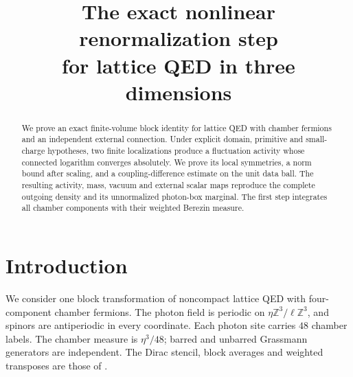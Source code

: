   \RequirePackage[backend=biber,style=alphabetic,backref=true,
    giveninits=true,isbn=false,date=year]{biblatex}
  
  \setcounter{biburlnumpenalty}{100}
  \setcounter{biburllcpenalty}{100}
  \setcounter{biburlucpenalty}{100}
  \renewcommand*{\bibfont}{\footnotesize}
\makeatother
\usepackage{mathrsfs}
\newcommand{\R}{\mathbb R}
\newcommand{\C}{\mathbb C}
\newcommand{\Z}{\mathbb Z}
\newcommand{\N}{\mathbb N}
\newcommand{\Sspace}{\mathcal S}
\newcommand{\dd}{\mathrm d}
\DeclareMathOperator{\supp}{supp}
\DeclareMathOperator{\tr}{tr}
\DeclareMathOperator{\diag}{diag}
\newcommand{\extref}[2]{#1 of~\cite{#2}}
\newcommand{\exteq}[2]{(#1) of~\cite{#2}}
\allowdisplaybreaks
\title[The exact nonlinear renormalization step]
{The exact nonlinear renormalization step\\for lattice QED in three dimensions}
\date{}

\begin{abstract}
We prove an exact finite-volume block identity for lattice QED with
chamber fermions and an independent external connection. Under explicit
domain, primitive and small-charge hypotheses, two finite localizations
produce a fluctuation activity whose connected logarithm converges
absolutely. We prove its local symmetries, a norm bound after scaling,
and a coupling-difference estimate on the unit data ball. The resulting
activity, mass, vacuum and external scalar maps reproduce the complete
outgoing density and its unnormalized photon-box marginal. The first
step integrates all chamber components with their weighted Berezin
measure.
\end{abstract}
\maketitle
\tableofcontents
\section{Introduction}\label{sec:introduction}

We consider one block transformation of noncompact lattice QED with
four-component chamber fermions. The photon field is periodic on
$\eta\Z^3/\ell\Z^3$, and spinors are antiperiodic in every coordinate.
Each photon site carries $48$ chamber labels. The chamber measure is
$\eta^3/48$; barred and unbarred Grassmann generators are independent.
The Dirac stencil, block averages and weighted transposes are those of
\cite[\S1]{FermionBlockManuscript}.

